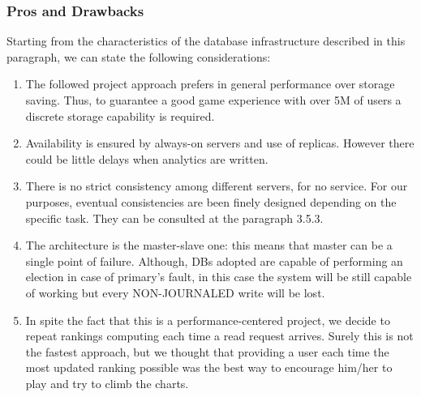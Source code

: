 \subsubsection{Pros and Drawbacks}
Starting from the characteristics of the database infrastructure described in this paragraph, we can state the following considerations:
\begin{enumerate}
	\item The followed project approach prefers in general performance over storage saving. Thus, to guarantee a good game experience with over 5M of users a discrete storage capability is required.
	\item Availability is ensured by always-on servers and use of replicas. However there could be little delays when analytics are written. 
	\item There is no strict consistency among different servers, for no service. For our purposes, eventual consistencies are been finely designed depending on the specific task. They can be consulted at the paragraph 3.5.3.
	\item The architecture is the master-slave one: this means that master can be a single point of failure. Although, DBs adopted are capable of performing an election in case of primary’s fault, in this case the system will be still capable of working but every NON-JOURNALED write will be lost.  
	\item In spite the fact that this is a performance-centered project, we decide to repeat rankings computing each time a read request arrives. Surely this is not the fastest approach, but we thought that providing a user each time the most updated ranking possible was the best way to encourage him/her to play and try to climb the charts.
\end{enumerate}

